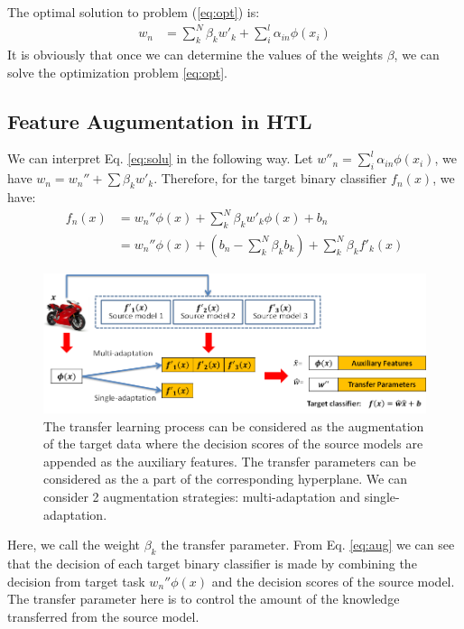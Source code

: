 The optimal solution to problem (\ref{eq:opt}) is:
\begin{equation}\label{eq:solu}
\begin{aligned}
{w_{n}}&= \sum\limits_k^N {{\beta _k}{{w'}_k}}  + \sum\limits_i^l {{\alpha _{in}}{\phi(x_i)}} 
\end{aligned}
\end{equation}
It is obviously that once we can determine the values of the weights $\beta$, we can solve the optimization problem \eqref{eq:opt}.

\subsection{Feature Augumentation in HTL}
We can interpret Eq. \eqref{eq:solu} in the following way. Let $w''_n=\sum\limits_i^l {{\alpha _{in}}{\phi(x_i)}}$, we have $w_{n} = w_{n}''+\sum\limits{\beta _kw'_k}$. Therefore, for the target binary classifier $f_n(x)$, we have:
\begin{equation}\label{eq:aug_pre}
\begin{aligned}
f_n(x)&=w_{n}''\phi(x)+\sum\limits_k^N{\beta _kw'_k\phi(x)}+b_n\\
&=w_{n}''\phi(x)+(b_n-\sum\limits_k^N{\beta _kb_k})+\sum\limits_k^N{\beta _kf'_k(x)}
\end{aligned}
\end{equation}
\begin{figure}
\centering
\includegraphics[scale=0.7]{fig/aug2.png}
\caption{The transfer learning process can be considered as the augmentation of the target data where the decision scores of the source models are appended as the auxiliary features. The transfer parameters can be considered as the a part of the corresponding hyperplane. We can consider 2 augmentation strategies: multi-adaptation and single-adaptation.}\label{fig:aug}
\end{figure}
Here, we call the weight $\beta_k$ the transfer parameter. From Eq. \eqref{eq:aug} we can see that the decision of each target binary classifier is made by combining the decision from target task $w_{n}''\phi(x)$ and the decision scores of the source model. The transfer parameter here is to control the amount of the knowledge transferred from the source model.

